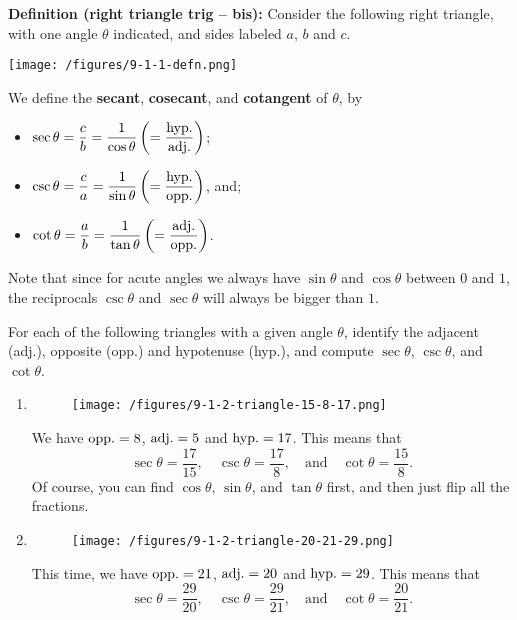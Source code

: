 \documentclass{ximera}
\begin{document}
\begin{callout}
  {\bf Definition (right triangle trig -- bis):} Consider the following right triangle, with one angle $\theta$ indicated, and sides labeled $a$, $b$ and $c$.

  \begin{center}
    \texttt{[image: /figures/9-1-1-defn.png]}
  \end{center}

  
  We define the {\bf secant}, {\bf cosecant}, and {\bf cotangent} of $\theta$, by
  \begin{itemize}
  \item $\displaystyle{\sec\theta = \frac{c}{b} = \frac{1}{\cos\theta} \left(= \frac{\rm hyp.}{\rm adj.}\right)}$;
  \item $\displaystyle{\csc\theta = \frac{c}{a}=\frac{1}{\sin\theta}\left(=\frac{\rm hyp.}{\rm opp.}\right)}$, and;
  \item $\displaystyle{\cot\theta = \frac{a}{b}=\frac{1}{\tan\theta} \left(= \frac{\rm adj.}{\rm opp.}\right)}$.
  \end{itemize}
\end{callout}

Note that since for acute angles we always have $\sin\theta$ and $\cos\theta$ between $0$ and $1$, the reciprocals $\csc\theta$ and $\sec\theta$ will always be bigger than $1$.


\begin{example}
  For each of the following triangles with a given angle $\theta$, identify the adjacent (adj.), opposite (opp.) and hypotenuse (hyp.), and compute $\sec \theta$, $\csc \theta$, and $\cot\theta$.
  \begin{enumerate}[label=\alph*.]
  \item  \begin{figure}[h]
      \centering
      \texttt{[image: /figures/9-1-2-triangle-15-8-17.png]}
    \end{figure}
    \begin{explanation}
      We have ${\rm opp.} = 8$, ${\rm adj.} = 5$ and ${\rm hyp.} = 17$. This means that $$\sec\theta = \frac{17}{15}, \quad \csc \theta =\frac{17}{8}, \quad\mbox{and}\quad \cot\theta =\frac{15}{8}. $$Of course, you can find $\cos \theta$, $\sin \theta$, and $\tan\theta$ first, and then just flip all the fractions.
    \end{explanation}
  \item \begin{figure}[h]
      \centering
      \texttt{[image: /figures/9-1-2-triangle-20-21-29.png]}
    \end{figure}
    \begin{explanation}
      This time, we have ${\rm opp.} = 21$, ${\rm adj.} = 20$ and ${\rm hyp.} = 29$. This means that $$\sec\theta = \frac{29}{20}, \quad \csc \theta =\frac{29}{21}, \quad\mbox{and}\quad \cot\theta =\frac{20}{21}. $$
    \end{explanation}
  \end{enumerate}
\end{example}
\end{document}
